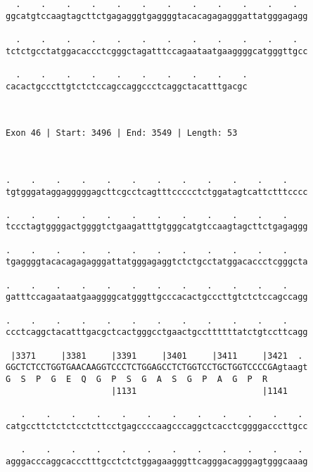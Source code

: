 \documentclass{article}
\begin{document}
\begin{Verbatim}
  .    .    .    .    .    .    .    .    .    .    .    .  
ggcatgtccaagtagcttctgagagggtgaggggtacacagagagggattatgggagagg
                                                            
  .    .    .    .    .    .    .    .    .    .    .    .  
tctctgcctatggacaccctcgggctagatttccagaataatgaaggggcatgggttgcc
                                                            
  .    .    .    .    .    .    .    .    .    .
cacactgcccttgtctctccagccaggccctcaggctacatttgacgc
                                                
                                                
 
Exon 46 | Start: 3496 | End: 3549 | Length: 53



.    .    .    .    .    .    .    .    .    .    .    .    
tgtgggataggagggggagcttcgcctcagtttccccctctggatagtcattctttcccc
                                                            
.    .    .    .    .    .    .    .    .    .    .    .    
tccctagtggggactggggtctgaagatttgtgggcatgtccaagtagcttctgagaggg
                                                            
.    .    .    .    .    .    .    .    .    .    .    .    
tgaggggtacacagagagggattatgggagaggtctctgcctatggacaccctcgggcta
                                                            
.    .    .    .    .    .    .    .    .    .    .    .    
gatttccagaataatgaaggggcatgggttgcccacactgcccttgtctctccagccagg
                                                            
.    .    .    .    .    .    .    .    .    .    .    .    
ccctcaggctacatttgacgctcactgggcctgaactgccttttttatctgtccttcagg
                                                            
 |3371     |3381     |3391     |3401     |3411     |3421  . 
GGCTCTCCTGGTGAACAAGGTCCCTCTGGAGCCTCTGGTCCTGCTGGTCCCCGAgtaagt
G  S  P  G  E  Q  G  P  S  G  A  S  G  P  A  G  P  R        
                     |1131                         |1141    
  
   .    .    .    .    .    .    .    .    .    .    .    . 
catgccttctctctcctcttcctgagccccaagcccaggctcacctcggggacccttgcc
                                                            
   .    .    .    .    .    .    .    .    .    .    .    . 
agggacccaggcaccctttgcctctctggagaagggttcagggacagggagtgggcaaag
                                                            

\end{Verbatim}
\end{document}
